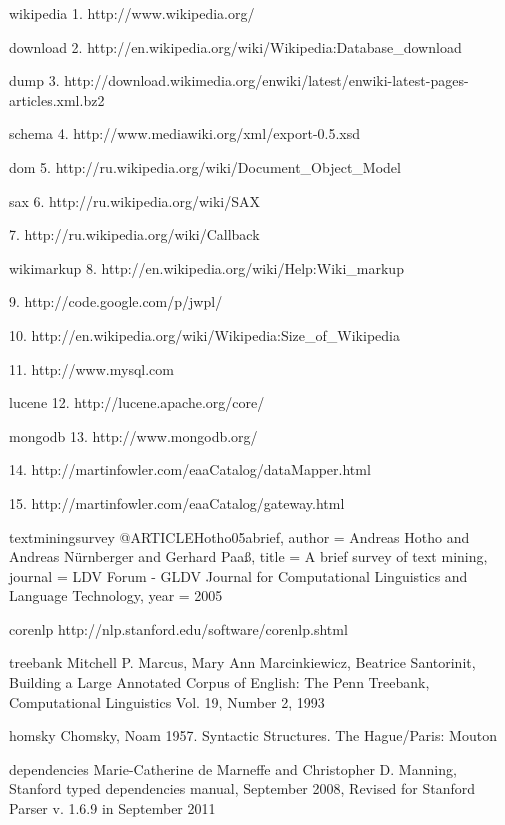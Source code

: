 
wikipedia
1. http://www.wikipedia.org/

download
2. http://en.wikipedia.org/wiki/Wikipedia:Database_download

dump
3. http://download.wikimedia.org/enwiki/latest/enwiki-latest-pages-articles.xml.bz2

schema
4. http://www.mediawiki.org/xml/export-0.5.xsd

dom
5. http://ru.wikipedia.org/wiki/Document_Object_Model

sax
6. http://ru.wikipedia.org/wiki/SAX

7. http://ru.wikipedia.org/wiki/Callback

wikimarkup
8. http://en.wikipedia.org/wiki/Help:Wiki_markup

9. http://code.google.com/p/jwpl/

10. http://en.wikipedia.org/wiki/Wikipedia:Size_of_Wikipedia

11. http://www.mysql.com

lucene
12. http://lucene.apache.org/core/

mongodb
13. http://www.mongodb.org/

14. http://martinfowler.com/eaaCatalog/dataMapper.html

15. http://martinfowler.com/eaaCatalog/gateway.html

textminingsurvey
@ARTICLE{Hotho05abrief,
    author = {Andreas Hotho and Andreas Nürnberger and Gerhard Paaß},
    title = {A brief survey of text mining},
    journal = {LDV Forum - GLDV Journal for Computational Linguistics and Language Technology},
    year = {2005}
}

corenlp
http://nlp.stanford.edu/software/corenlp.shtml

treebank
Mitchell  P. Marcus, Mary Ann Marcinkiewicz, Beatrice Santorinit, Building a Large Annotated Corpus of English: The Penn Treebank, Computational Linguistics Vol. 19, Number 2, 1993

homsky
Chomsky, Noam 1957. Syntactic Structures. The Hague/Paris: Mouton

dependencies
Marie-Catherine de Marneffe and Christopher D. Manning, Stanford typed dependencies manual, September 2008, Revised for Stanford Parser v. 1.6.9 in September 2011

